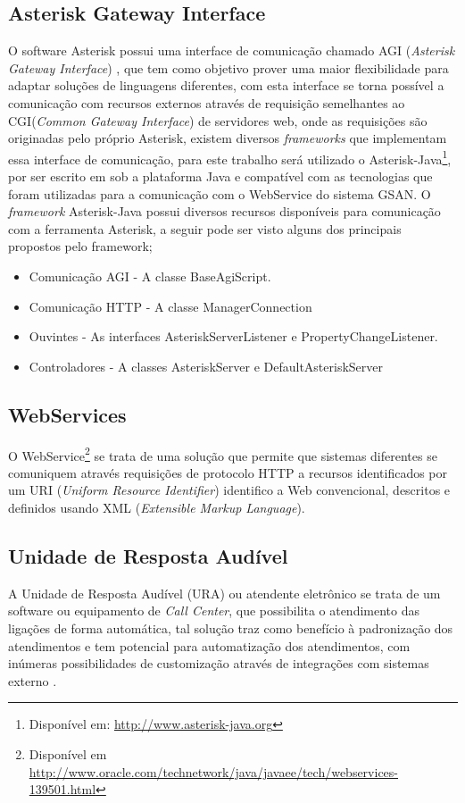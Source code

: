 \subsection{Asterisk Gateway Interface}
O software Asterisk possui uma interface de comunicação chamado AGI (\textit{Asterisk Gateway Interface}) \cite{asteriskAgi}, que tem como objetivo prover uma maior flexibilidade para adaptar soluções de linguagens diferentes, com esta interface se torna possível a comunicação com recursos externos através de requisição semelhantes ao CGI(\textit{Common Gateway Interface}) de servidores web, onde as requisições são originadas pelo próprio Asterisk, existem diversos \textit{frameworks} que implementam essa interface de comunicação, para este trabalho será utilizado o Asterisk-Java\footnote{Disponível em: \url{http://www.asterisk-java.org}}\label{key:asteriskjava}, por ser escrito em sob a plataforma Java e compatível com as tecnologias que foram utilizadas para a comunicação com o WebService do sistema GSAN.
O \textit{framework} Asterisk-Java possui diversos recursos disponíveis para comunicação com a ferramenta Asterisk, a seguir pode ser visto alguns dos principais propostos pelo framework;

\begin{itemize}
	\item Comunicação AGI - A classe BaseAgiScript.
	\item Comunicação HTTP - A classe ManagerConnection
	\item Ouvintes - As interfaces AsteriskServerListener e PropertyChangeListener.
	\item Controladores - A classes AsteriskServer e DefaultAsteriskServer
\end{itemize}


\subsection{WebServices}
O WebService\footnote{Disponível em \url{http://www.oracle.com/technetwork/java/javaee/tech/webservices-139501.html}} se trata de uma solução que permite que sistemas diferentes se comuniquem através requisições de protocolo HTTP a recursos identificados por um URI (\textit{Uniform Resource Identifier}) identifico a Web convencional, descritos e definidos usando XML (\textit{Extensible Markup Language}).

\subsection{Unidade de Resposta Audível}
A Unidade de Resposta Audível\label{key:URA} (URA) ou atendente eletrônico se trata de um software ou equipamento de \textit{Call Center}, que possibilita o atendimento das ligações de forma automática, tal solução traz como benefício à padronização dos atendimentos e tem potencial para automatização dos atendimentos, com inúmeras possibilidades de customização através de integrações com sistemas externo \cite{VIEIRA:2007}.

